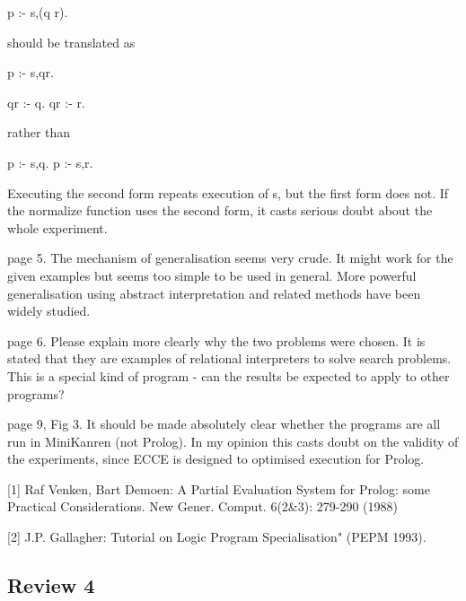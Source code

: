 p :- s,(q \/ r).

should be translated as

p :- s,qr.

qr :- q.
qr :- r.

rather than

p :- s,q.
p :- s,r.

Executing the second form repeats execution of s, but the first form does not.  If the normalize function uses the second form, it casts serious doubt about the whole experiment.

page 5.  The mechanism of generalisation seems very crude.  It might work for the given examples but seems too simple to be used in general.  More powerful generalisation using abstract interpretation and related methods have been widely studied.

page 6.  Please explain more clearly why the two problems were chosen. It is stated that they are examples of relational interpreters to solve search problems. This is a special kind of program - can the results be expected to apply to other programs?

page 9, Fig 3.  It should be made absolutely clear whether the programs are all run in MiniKanren (not Prolog). In my opinion this casts doubt on the validity of the experiments, since ECCE is designed to optimised execution for Prolog.


[1] Raf Venken, Bart Demoen:
A Partial Evaluation System for Prolog: some Practical Considerations. New Gener. Comput. 6(2\&3): 279-290 (1988)

[2] J.P. Gallagher: Tutorial on Logic Program Specialisation"  (PEPM 1993).

\subsection*{Review 4}

